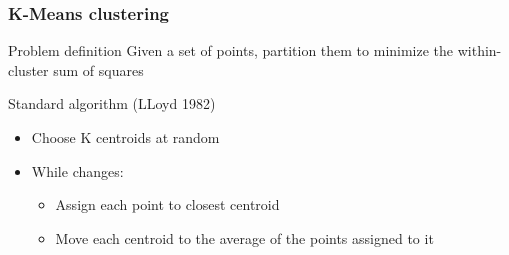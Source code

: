 \begin{frame}
	\frametitle{K-Means clustering}
  \begin{block}{Problem definition}
  Given a set of points, partition them to minimize the within-cluster sum of squares
  \end{block}
	
\begin{block}{Standard algorithm (LLoyd 1982)}
      \begin{itemize}
	\item Choose K centroids at random
	\item While changes:
	  \begin{itemize}
	  \item Assign each point to closest centroid
	  \item Move each centroid to the average of the points assigned to it
	  \end{itemize}
      \end{itemize}
      \end{block}
\end{frame}

